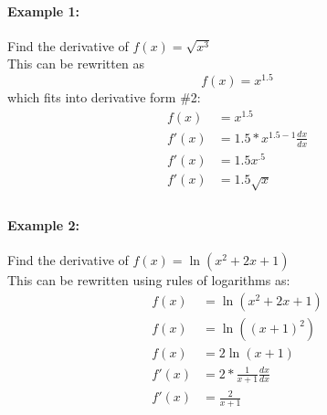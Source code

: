 \documentclass[../revisedmain.tex]{subfiles}
\begin{document}
\paragraph{Example 1:} Find the derivative of \(f(x)=\sqrt{x^3}\)\\This can be rewritten as \[f(x)=x^{1.5}\] which fits into derivative form \#2:
\begin{equation}\begin{split}f(x)&=x^{1.5}\\f'(x)&=1.5*x^{1.5-1} \frac{dx}{dx}\\f'(x)&=1.5x^{.5}\\f'(x)&=1.5\sqrt{x}\\\end{split}\end{equation}
\paragraph{Example 2:} Find the derivative of \(f(x)=\ln(x^2+2x+1)\)\\This can be rewritten using rules of logarithms as:
\begin{equation}
	\begin{split}f(x)&=\ln(x^2+2x+1)\\f(x)&=\ln\left( (x+1)^2 \right)\\f(x)&=2\ln(x+1)\\f'(x)&=2*\frac{1}{x+1}\frac{dx}{dx}\\f'(x)&=\frac{2}{x+1}\\\end{split}
\end{equation}
\end{document}
